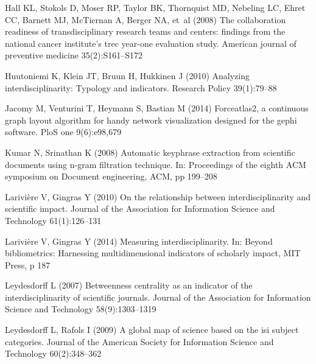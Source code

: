 \begin{thebibliography}{84}
Hall KL, Stokols D, Moser RP, Taylor BK, Thornquist MD, Nebeling LC, Ehret CC,
  Barnett MJ, McTiernan A, Berger NA, et~al (2008) The collaboration readiness
  of transdisciplinary research teams and centers: findings from the national
  cancer institute's trec year-one evaluation study. American journal of
  preventive medicine 35(2):S161--S172

Huutoniemi K, Klein JT, Bruun H, Hukkinen J (2010) Analyzing
  interdisciplinarity: Typology and indicators. Research Policy 39(1):79--88

Jacomy M, Venturini T, Heymann S, Bastian M (2014) Forceatlas2, a continuous
  graph layout algorithm for handy network visualization designed for the gephi
  software. PloS one 9(6):e98,679

Kumar N, Srinathan K (2008) Automatic keyphrase extraction from scientific
  documents using n-gram filtration technique. In: Proceedings of the eighth
  ACM symposium on Document engineering, ACM, pp 199--208

Larivi{\`e}re V, Gingras Y (2010) On the relationship between
  interdisciplinarity and scientific impact. Journal of the Association for
  Information Science and Technology 61(1):126--131

Larivi{\`e}re V, Gingras Y (2014) Measuring interdisciplinarity. In: Beyond
  bibliometrics: Harnessing multidimensional indicators of scholarly impact,
  MIT Press, p 187

Leydesdorff L (2007) Betweenness centrality as an indicator of the
  interdisciplinarity of scientific journals. Journal of the Association for
  Information Science and Technology 58(9):1303--1319

Leydesdorff L, Rafols I (2009) A global map of science based on the isi subject
  categories. Journal of the American Society for Information Science and
  Technology 60(2):348--362


\end{thebibliography}

